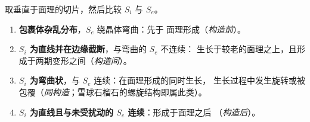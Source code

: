 \begin{method}[由包裹体迹线确定变斑晶的形成时序]\label{met:b2:field-lab-methods-2:timing}
取垂直于面理的切片，然后比较 $S_i$ 与 $S_e$。
\begin{enumerate}
  \item \textbf{包裹体杂乱分布}，$S_e$ 绕晶体弯曲：先于
        面理形成（\emph{构造前}）。
  \item \textbf{$S_i$ 为直线并在边缘截断}，与弯曲的 $S_e$ 不连续：
        生长于较老的面理之上，且形成于两期变形之间（\emph{构造间}）。
  \item \textbf{$S_i$ 为弯曲状}，与 $S_e$ 连续：在面理形成的同时生长，
        生长过程中发生旋转或被包覆（\emph{同构造}；雪球石榴石的螺旋结构即属此类）。
  \item \textbf{$S_i$ 为直线且与未受扰动的 $S_e$ 连续}：形成于面理之后
        （\emph{构造后}）。
\end{enumerate}
\end{method}

